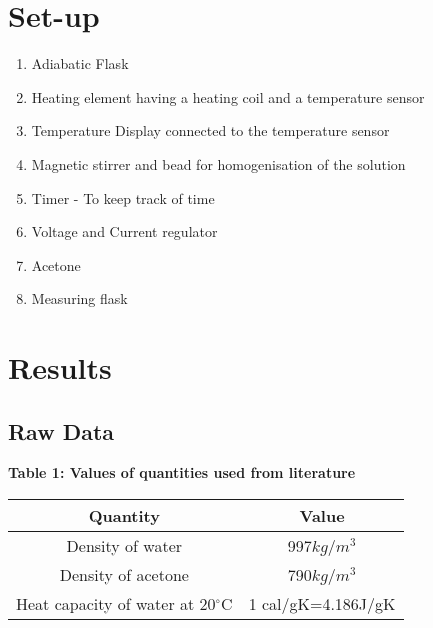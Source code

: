 \documentclass[11pt]{article}
\providecommand{\tightlist}{%
      \setlength{\itemsep}{0pt}\setlength{\parskip}{0pt}}
\begin{document}
\hypertarget{set-up}{%
  \section{Set-up}\label{set-up}}

\begin{enumerate}
  \def\labelenumi{\arabic{enumi}.}
  \tightlist
  \item
        Adiabatic Flask
  \item
        Heating element having a heating coil and a temperature sensor
  \item
        Temperature Display connected to the temperature sensor
  \item
        Magnetic stirrer and bead for homogenisation of the solution
  \item
        Timer - To keep track of time
  \item
        Voltage and Current regulator
  \item
        Acetone
  \item
        Measuring flask
\end{enumerate}

\pagebreak
\hypertarget{results}{%
  \section{Results}\label{results}}

\hypertarget{raw-data}{%
  \subsection{Raw Data}\label{raw-data}}

\textbf{Table 1: Values of quantities used from literature}

\begin{table}[h]
  \centering
  \begin{tabular}{|c|c|}
    \hline
    Quantity                                  & Value              \\
    \hline
    Density of water                          & 997\(kg/m^3\)      \\
    \hline
    Density of acetone                        & 790\(kg/m^3\)      \\
    \hline
    Heat capacity of water at 20\(^{\circ}\)C & 1 cal/gK=4.186J/gK \\
    \hline
  \end{tabular}
\end{table}
\end{document}
